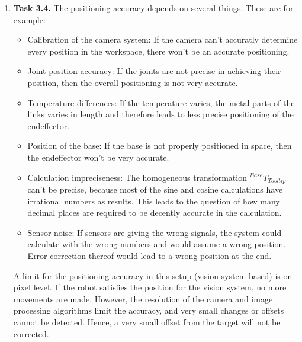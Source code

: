 \documentclass[a4paper,11pt]{article}
\begin{document}
\begin {enumerate}
\item[\textbf{Task 3.4.}] The positioning accuracy depends on several things. These are for example:

\begin{itemize}
  \item Calibration of the camera system: If the camera can't accuratly determine every position in the workspace, there won't be an accurate positioning.
  \item Joint position accuracy: If the joints are not precise in achieving their position, then the overall positioning is not very accurate.
  \item Temperature differences: If the temperature varies, the metal parts of the links varies in length and therefore leads to less precise positioning of the endeffector.
  \item Position of the base: If the base is not properly positioned in space, then the endeffector won't be very accurate.
  \item Calculation impreciseness: The homogeneous transformation ${^{Base}T_{Tooltip}}$ can't be precise, because most of the sine and cosine calculations have irrational numbers as results. This leads to the question of how many decimal places are required to be decently accurate in the calculation.
  \item Sensor noise: If sensors are giving the wrong signals, the system could calculate with the wrong numbers and would assume a wrong position. Error-correction thereof would lead to a wrong position at the end.
\end{itemize}

A limit for the positioning accuracy in this setup (vision system based) is on pixel level. If the robot satisfies the position for the vision system, no more movements are made. However, the resolution of the camera and image processing algorithms limit the accuracy, and very small changes or offsets cannot be detected. Hence, a very small offset from the target will not be corrected.

\end{enumerate}
\end{document}
